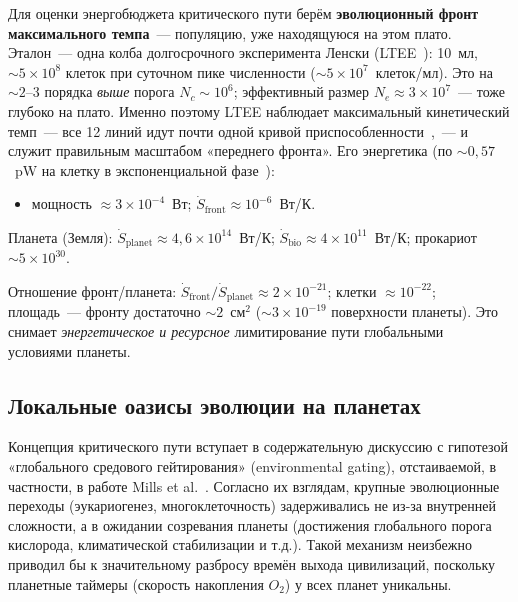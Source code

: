 \documentclass[12pt,a4paper]{article}
\begin{document}
Для оценки энергобюджета критического пути берём \textbf{эволюционный фронт максимального темпа}~--- популяцию, уже находящуюся на этом плато. Эталон~--- одна колба долгосрочного эксперимента Ленски (LTEE~\cite{Lenski2017}): 10~мл, $\sim 5 \times 10^{8}$ клеток при суточном пике численности ($\sim 5 \times 10^{7}$~клеток/мл). Это на $\sim 2$--$3$ порядка \emph{выше} порога $N_c \sim 10^{6}$; эффективный размер $N_e \approx 3 \times 10^{7}$~--- тоже глубоко на плато. Именно поэтому LTEE наблюдает максимальный кинетический темп~--- все 12 линий идут почти одной кривой приспособленности~\cite{Wiser2013,Lenski1994},~--- и служит правильным масштабом «переднего фронта». Его энергетика (по $\sim 0{,}57$~pW на клетку в экспоненциальной фазе~\cite{Deng2021ATP}):
\begin{itemize}
\item мощность $\approx 3 \times 10^{-4}$~Вт; $\dot{S}_{\mathrm{front}} \approx 10^{-6}$~Вт/К.
\end{itemize}
Планета (Земля): $\dot{S}_{\mathrm{planet}} \approx 4{,}6 \times 10^{14}$~Вт/К; $\dot{S}_{\mathrm{bio}} \approx 4 \times 10^{11}$~Вт/К; прокариот $\sim 5 \times 10^{30}$.

Отношение фронт/планета: $\dot{S}_{\mathrm{front}}/\dot{S}_{\mathrm{planet}} \approx 2 \times 10^{-21}$; клетки $\approx 10^{-22}$; площадь~--- фронту достаточно $\sim 2$~см$^2$ ($\sim 3 \times 10^{-19}$ поверхности планеты). Это снимает \emph{энергетическое и ресурсное} лимитирование пути глобальными условиями планеты.

\subsection{Локальные оазисы эволюции на планетах}
\label{sec:applicability_bounds}

Концепция критического пути вступает в содержательную дискуссию с гипотезой «глобального средового гейтирования» (environmental gating), отстаиваемой, в частности, в работе Mills et al.~\cite{Mills2025}. Согласно их взглядам, крупные эволюционные переходы (эукариогенез, многоклеточность) задерживались не из-за внутренней сложности, а в ожидании созревания планеты (достижения глобального порога кислорода, климатической стабилизации и т.д.). Такой механизм неизбежно приводил бы к значительному разбросу времён выхода цивилизаций, поскольку планетные таймеры (скорость накопления $O_2$) у всех планет уникальны.
\end{document}

